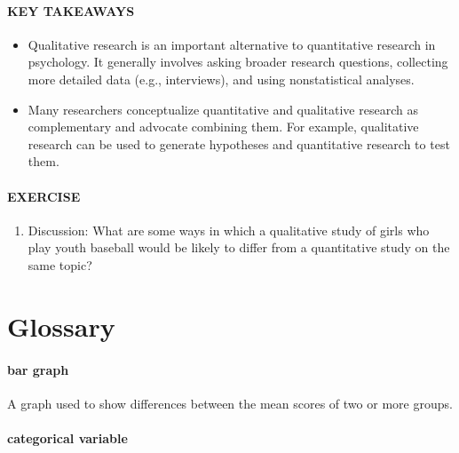 \documentclass[
]{krantz}
\providecommand{\tightlist}{%
  \setlength{\itemsep}{0pt}\setlength{\parskip}{0pt}}
\begin{document}
\hypertarget{key-takeaways-5}{%
\paragraph*{KEY TAKEAWAYS}\label{key-takeaways-5}}

\begin{itemize}
\tightlist
\item
  Qualitative research is an important alternative to quantitative research in psychology. It generally involves asking broader research questions, collecting more detailed data (e.g., interviews), and using nonstatistical analyses.
\item
  Many researchers conceptualize quantitative and qualitative research as complementary and advocate combining them. For example, qualitative research can be used to generate hypotheses and quantitative research to test them.
\end{itemize}

\hypertarget{exercise}{%
\paragraph*{EXERCISE}\label{exercise}}

\begin{enumerate}
\def\labelenumi{\arabic{enumi}.}
\tightlist
\item
  Discussion: What are some ways in which a qualitative study of girls who play youth baseball would be likely to differ from a quantitative study on the same topic?
\end{enumerate}

\hypertarget{glossary-1}{%
\section{Glossary}\label{glossary-1}}

\hypertarget{bar-graph}{%
\paragraph*{bar graph}\label{bar-graph}}

A graph used to show differences between the mean scores of two or more groups.

\hypertarget{categorical-variable}{%
\paragraph*{categorical variable}\label{categorical-variable}}
\end{document}

